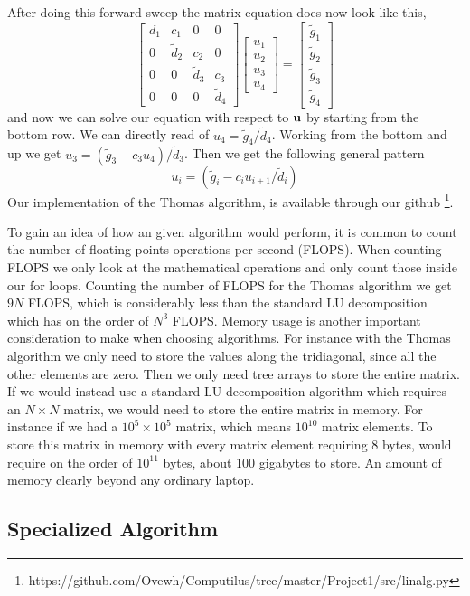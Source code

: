 After doing this forward sweep the matrix equation does now look like this,
\begin{equation*}
  \begin{bmatrix}
    d_1 & c_1 & 0 & 0 \\
    0 & \tilde{d}_2 & c_2 & 0 \\
    0 & 0 & \tilde{d}_3 & c_3  \\
    0 & 0 & 0 & \tilde{d}_4 
  \end{bmatrix} \begin{bmatrix}
    u_1 \\ u_2 \\ u_3 \\ u_4
  \end{bmatrix} = \begin{bmatrix}
    \tilde{g}_1 \\ \tilde{g}_2 \\ \tilde{g}_3 \\ \tilde{g}_4
  \end{bmatrix}
\end{equation*}
and now we can solve our equation with respect to $\mathbf{u}$ by starting from
the bottom row. We can directly read of $u_4 = \tilde{g}_4 / \tilde{d}_4$.
Working from the bottom and up we get $u_3 = \left(\tilde{g}_3-c_3
u_4\right)/\tilde{d}_3$. Then we get the following general pattern
\begin{equation}
  u_i = \left(\tilde{g}_i - c_i u_{i+1}/\tilde{d}_i \right)
\end{equation}  
Our implementation of the Thomas algorithm, is available
through our github \footnote{https://github.com/Ovewh/Computilus/tree/master/Project1/src/linalg.py}.


To gain an idea of how an given algorithm would perform, it is common to count
the number of floating points operations per second (FLOPS). When counting FLOPS
we only look at the mathematical operations and only count those inside our
for loops. Counting the number of FLOPS for the Thomas algorithm we get $9N$
FLOPS, which is considerably less than the standard LU decomposition which has
on the order of $N^3$ FLOPS.   
Memory usage is another important consideration to make when choosing
algorithms. For instance with the Thomas algorithm we only need to store the
values along the tridiagonal, since all the other elements are zero. Then we only need tree arrays to store the entire matrix. If we
would instead use a standard LU decomposition algorithm which requires an $N
\times N$ matrix, we would need to store the entire matrix in memory. For
instance if we had a $10^5 \times 10^5$ matrix, which means $10^10$ matrix elements. To store this matrix in memory with
every matrix element requiring 8 bytes, would require on the order of $10^{11}$
bytes, about 100 gigabytes to store. An amount of memory clearly beyond any
ordinary laptop. 

\subsection*{Specialized Algorithm}

